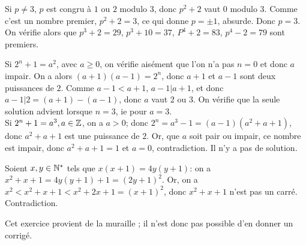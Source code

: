 \begin{sol}[3]
		Si $p \neq 3$, $p$ est congru \`a $1$ ou $2$ modulo $3$, donc $p^2+2$ vaut $0$ modulo $3$. Comme c'est un nombre premier, $p^2+2=3$, ce qui donne $p=\pm 1$, absurde. Donc $p=3$. On v\'erifie alors que $p^3+2=29$, $p^3+10=37$, $P^4+2=83$, $p^4-2=79$ sont premiers.  
\end{sol}

\begin{sol}[4]
		Si $2^n+1=a^2$, avec $a \geq 0$, on v\'erifie ais\'ement que l'on n'a pas $n=0$ et donc $a$ impair. On a alors $(a+1)(a-1)=2^n$, donc $a+1$ et $a-1$ sont deux puissances de $2$. Comme $a-1 < a+1$, $a-1|a+1$, et donc $a-1|2=(a+1)-(a-1)$, donc $a$ vaut $2$ ou $3$. On v\'erifie que la seule solution advient lorsque $n=3$, ie pour $a=3$. \\
		Si $2^n+1=a^3, a\in \mathbb Z$, on a $a > 0$; donc $2^n=a^3-1=(a-1)(a^2+a+1)$, donc $a^2+a+1$ est une puissance de $2$. Or, que $a$ soit pair ou impair, ce nombre est impair, donc $a^2+a+1=1$ et $a=0$, contradiction. Il n'y a pas de solution.
\end{sol}

\begin{sol}[5]
		Soient $x,y \in \mathbb{N}^*$ tels que $x(x+1)=4y(y+1)$: on a $x^2+x+1=4y(y+1)+1=(2y+1)^2$. Or, on a $x^2 < x^2+x+1 < x^2+2x+1=(x+1)^2$, donc $x^2+x+1$ n'est pas un carr\'e. Contradiction.
\end{sol}

\begin{sol}[6]
		Cet exercice provient de la muraille ; il n'est donc pas possible d'en donner un corrig\'e. 
\end{sol}

